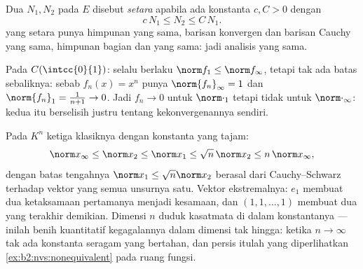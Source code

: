 \begin{definition}\label{def:b2:nvs:equivalent}
Dua  $N_1, N_2$ pada $E$ disebut \emph{setara} apabila ada konstanta $c, C > 0$ dengan
\[
c\,N_1 \leq N_2 \leq C\, N_1 .
\]
 yang setara punya himpunan  yang sama, barisan konvergen dan
barisan Cauchy yang sama, himpunan bagian  dan  yang sama:
jadi analisis yang sama.
\end{definition}

\begin{example}\label{ex:b2:nvs:nonequivalent}
Pada $C(\intcc{0}{1})$: selalu berlaku $\norm f_1 \leq \norm f_\infty$,
tetapi tak ada batas sebaliknya: sebab $f_n(x) = x^n$ punya
$\norm{f_n}_\infty = 1$ dan $\norm{f_n}_1 = \frac{1}{n+1} \to 0$. Jadi
$f_n \to 0$ untuk $\norm\cdot_1$ tetapi tidak untuk $\norm\cdot_\infty$:
kedua  itu berselisih justru tentang kekonvergenannya sendiri.
\end{example}

\begin{example}\label{ex:b2:nvs:constants}
Pada $K^n$ ketiga  klasiknya  dengan konstanta
yang tajam:
\[
\norm x_\infty \leq \norm x_2 \leq \norm x_1
\leq \sqrt n\,\norm x_2 \leq n\,\norm x_\infty ,
\]
dengan batas tengahnya $\norm x_1 \leq \sqrt n\norm x_2$ berasal dari
Cauchy--Schwarz terhadap vektor yang semua unsurnya satu. Vektor
ekstremalnya: $e_1$ membuat dua ketaksamaan pertamanya menjadi kesamaan,
dan $(1, 1, \dots, 1)$ membuat dua yang terakhir demikian. Dimensi $n$
duduk kasatmata di dalam konstantanya --- inilah benih kuantitatif
kegagalannya dalam dimensi tak hingga: ketika $n \to \infty$ tak ada
konstanta seragam yang bertahan, dan persis itulah yang diperlihatkan
\cref{ex:b2:nvs:nonequivalent} pada ruang fungsi.
\end{example}

